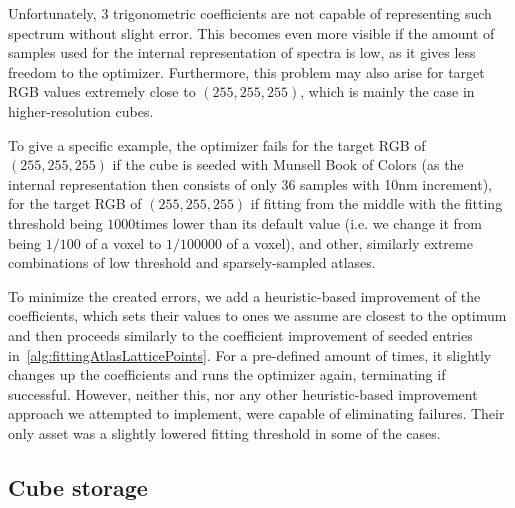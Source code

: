 Unfortunately, 3 trigonometric coefficients are not capable of representing such spectrum without slight error. This becomes even more visible if the amount of samples used for the internal representation of spectra is low, as it gives less freedom to the optimizer. Furthermore, this problem may also arise for target RGB values extremely close to $(255, 255, 255)$, which is mainly the case in higher-resolution cubes.

To give a specific example, the optimizer fails for the target RGB of $(255, 255, 255)$ if the cube is seeded with Munsell Book of Colors (as the internal representation then consists of only 36 samples with 10nm increment), for the target RGB of $(255, 255, 255)$ if fitting from the middle with the fitting threshold being $1000$times lower than its default value (i.e. we change it from being $1/100$ of a voxel to $1/100000$ of a voxel), and other, similarly extreme combinations of low threshold and sparsely-sampled atlases.

To minimize the created errors, we add a heuristic-based improvement of the coefficients, which sets their values to ones we assume are closest to the optimum and then proceeds similarly to the coefficient improvement of seeded entries in~\cref{alg:fittingAtlasLatticePoints}. For a pre-defined amount of times, it slightly changes up the coefficients and runs the optimizer again, terminating if successful. However, neither this, nor any other heuristic-based improvement approach we attempted to implement, were capable of eliminating failures. Their only asset was a slightly lowered fitting threshold in some of the cases.

\subsection{Cube storage}

